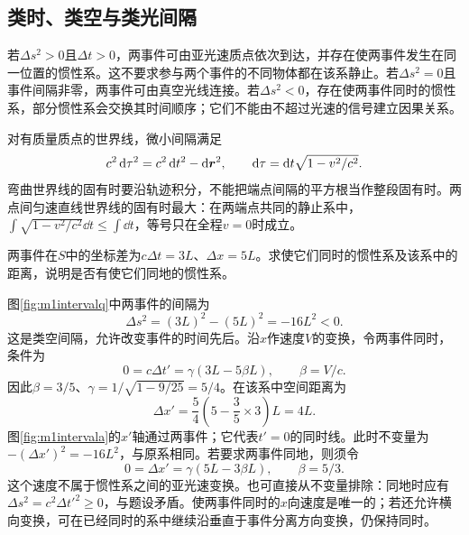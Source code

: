 \subsection{类时、类空与类光间隔}
若$\Delta s^2>0$且$\Delta t>0$，两事件可由亚光速质点依次到达，并存在使两事件发生在同一位置的惯性系。这不要求参与两个事件的不同物体都在该系静止。若$\Delta s^2=0$且事件间隔非零，两事件可由真空光线连接。若$\Delta s^2<0$，存在使两事件同时的惯性系，部分惯性系会交换其时间顺序；它们不能由不超过光速的信号建立因果关系。

对有质量质点的世界线，微小间隔满足
\begin{equation}\label{eq:m1proper}
 c^2\mathop{}\!\mathrm d\tau^2=c^2\mathop{}\!\mathrm d t^2-\mathop{}\!\mathrm d\bm{r}^2,
 \qquad \mathop{}\!\mathrm d\tau=\mathop{}\!\mathrm d t\sqrt{1-v^2/c^2}.
\end{equation}
弯曲世界线的固有时要沿轨迹积分，不能把端点间隔的平方根当作整段固有时。两点间匀速直线世界线的固有时最大：在两端点共同的静止系中，$\int\sqrt{1-v^2/c^2}\dd t\leq\int\dd t$，等号只在全程$v=0$时成立。

\begin{example}\label{ex:m1interval}
两事件在$S$中的坐标差为$c\Delta t=3L$、$\Delta x=5L$。求使它们同时的惯性系及该系中的距离，说明是否有使它们同地的惯性系。
\end{example}
\begin{solution}
图\ref{fig:m1intervalq}中两事件的间隔为
\[
 \Delta s^2=(3L)^2-(5L)^2=-16L^2<0.
\]
这是类空间隔，允许改变事件的时间先后。沿$x$作速度$V$的变换，令两事件同时，条件为
\[
 0=c\Delta t'=\gamma(3L-5\beta L),\qquad \beta=V/c.
\]
因此$\beta=3/5$、$\gamma=1/\sqrt{1-9/25}=5/4$。在该系中空间距离为
\[
 \Delta x'=\frac54\left(5-\frac35\times3\right)L=4L.
\]
图\ref{fig:m1intervala}的$x'$轴通过两事件；它代表$t'=0$的同时线。此时不变量为$-(\Delta x')^2=-16L^2$，与原系相同。若要求两事件同地，则须令
\[
 0=\Delta x'=\gamma(5L-3\beta L),\qquad \beta=5/3.
\]
这个速度不属于惯性系之间的亚光速变换。也可直接从不变量排除：同地时应有$\Delta s^2=c^2\Delta t'^2\geq0$，与题设矛盾。使两事件同时的$x$向速度是唯一的；若还允许横向变换，可在已经同时的系中继续沿垂直于事件分离方向变换，仍保持同时。
\end{solution}

